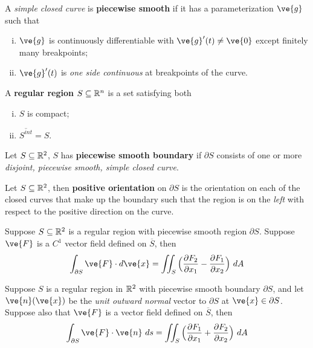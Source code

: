 \documentclass[11pt]{article}
\begin{document}
				\begin{definition}
					A \emph{simple closed curve} is \textbf{piecewise smooth} if it has a parameterization $\ve{g}$ such that
					\begin{enumerate}[(i)]
						\item $\ve{g}$ is continuously differentiable with $\ve{g}'(t) \neq \ve{0}$ except finitely many breakpoints;
						\item $\ve{g}'(t)$ is \emph{one side continuous} at breakpoints of the curve.
					\end{enumerate}
				\end{definition}
				
				\begin{definition}
					A \textbf{regular region} $S \subseteq \mathbb{R}^n$ is a set satisfying both
					\begin{enumerate}[(i)]
						\item $S$ is compact;
						\item $\overline{S^{int}} = S$.
					\end{enumerate}
				\end{definition}
				
				\begin{definition}
					Let $S \subseteq \mathbb{R}^2$, $S$ has \textbf{piecewise smooth boundary} if $\partial S$ consists of one or more \emph{disjoint, piecewise smooth, simple closed curve}.
				\end{definition}
				
				\begin{definition}
					Let $S \subseteq \mathbb{R}^2$, then \textbf{positive orientation} on $\partial S$ is the orientation on each of the closed curves that make up the boundary such that the region is on the \emph{left} with respect to the positive direction on the curve.
				\end{definition}
				
				\begin{theorem}
					Suppose $S \subseteq \mathbb{R}^2$ is a regular region with piecewise smooth region $\partial S$. Suppose $\ve{F}$ is a $C^1$ vector field defined on $\overline{S}$, then
					\begin{equation}
						\int_{\partial S} \ve{F}\cdot d\ve{x} = \iint_S \Big(\pd{F_2}{x_1} - \pd{F_1}{x_2}\Big)\ dA
					\end{equation}
				\end{theorem}
				
				\begin{corollary}
					Suppose $S$ is a regular region in $\mathbb{R}^2$ with piecewise smooth boundary $\partial S$, and let $\ve{n}(\ve{x})$ be the \emph{unit outward normal} vector to $\partial S$ at $\ve{x} \in \partial S$. Suppose also that $\ve{F}$ is a vector field defined on $\overline{S}$, then
					\begin{equation}
						\int_{\partial S} \ve{F} \cdot \ve{n}\ ds = \iint_S \Big(\pd{F_1}{x_1}  + \pd{F_2}{x_2}\Big)\ dA
					\end{equation}
%							
				\end{corollary}
\end{document}
